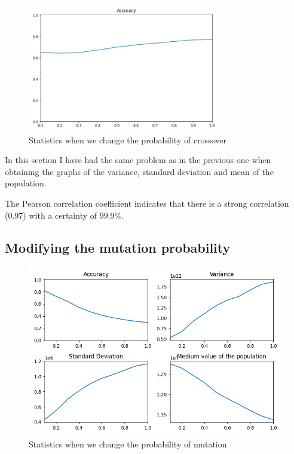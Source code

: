 \documentclass{article}
\begin{document}
    \begin{figure}[H]

        \centering
        \includegraphics[width=0.75\textwidth]{../media/ej1/04.CrossoverProb_behaviour.png}
        \caption{Statistics when we change the probability of crossover}
        \label{Statistics when we change the probability of crossover}

    \end{figure}

    In this section I have had the same problem as in the previous one when obtaining the graphs of the variance, standard deviation and mean of the population.

    The Pearson correlation coefficient indicates that there is a strong correlation (0.97) with a certainty of 99.9\%.

    \subsection*{Modifying the mutation probability}

    \begin{figure}[H]

        \centering
        \includegraphics[width=1\textwidth]{../media/ej1/05.MutationProb_behaviour.png}
        \caption{Statistics when we change the probability of mutation}
        \label{Statistics when we change the probability of mutation}

    \end{figure}
\end{document}
